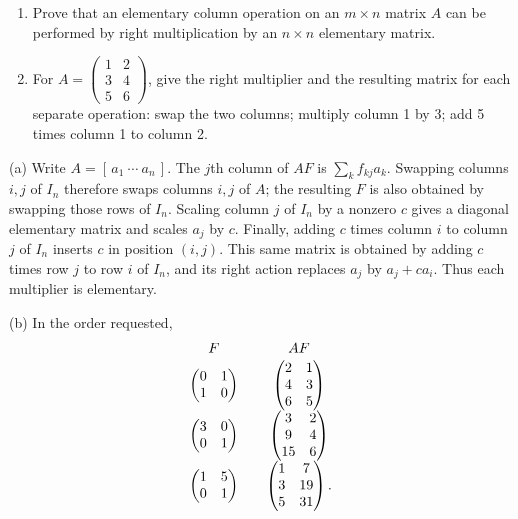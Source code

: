 \begin{problem}\label{ex:02:column-operations}
\begin{enumerate}
\item Prove that an elementary column operation on an $m\times n$ matrix $A$
can be performed by right multiplication by an $n\times n$ elementary matrix.
\item For $A=\begin{pmatrix}1&2\\3&4\\5&6\end{pmatrix}$,
give the right multiplier and the resulting matrix for each separate operation:
swap the two columns; multiply column 1 by 3; add 5 times column 1 to column 2.
\end{enumerate}
\end{problem}
\begin{solution}
(a) Write $A=[\,a_1\ \cdots\ a_n\,]$.
The $j$th column of $AF$ is $\sum_k f_{kj}a_k$.
Swapping columns $i,j$ of $I_n$ therefore swaps columns $i,j$ of $A$;
the resulting $F$ is also obtained by swapping those rows of $I_n$.
Scaling column $j$ of $I_n$ by a nonzero $c$ gives a diagonal elementary
matrix and scales $a_j$ by $c$.
Finally, adding $c$ times column $i$ to column $j$ of $I_n$ inserts $c$
in position $(i,j)$. This same matrix is obtained by adding $c$ times row $j$
to row $i$ of $I_n$, and its right action replaces $a_j$ by $a_j+ca_i$.
Thus each multiplier is elementary.

(b) In the order requested,
\[
\begin{array}{c@{\qquad}c}
F&AF\\[2pt]
\begin{pmatrix}0&1\\1&0\end{pmatrix}
&\begin{pmatrix}2&1\\4&3\\6&5\end{pmatrix}\\[9pt]
\begin{pmatrix}3&0\\0&1\end{pmatrix}
&\begin{pmatrix}3&2\\9&4\\15&6\end{pmatrix}\\[9pt]
\begin{pmatrix}1&5\\0&1\end{pmatrix}
&\begin{pmatrix}1&7\\3&19\\5&31\end{pmatrix}.
\end{array}
\]
\end{solution}

